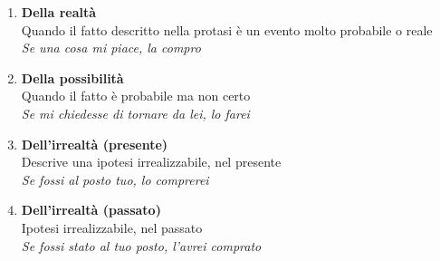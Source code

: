\documentclass[
  a4paper,
  twoside,
  11pt,
  chapterprefix=false,
  bibliography=totocnumbered,
  listof=flat]{scrbook}
\begin{document}
\begin{enumerate}
\def\labelenumi{(\arabic{enumi})}
\setcounter{enumi}{84}
\item
  \textbf{Della realtà}\\
  Quando il fatto descritto nella protasi è un evento molto probabile o reale\\
  \emph{Se una cosa mi piace, la compro}
\item
  \textbf{Della possibilità}\\
  Quando il fatto è probabile ma non certo\\
  \emph{Se mi chiedesse di tornare da lei, lo farei}
\item
  \textbf{Dell'irrealtà (presente)}\\
  Descrive una ipotesi irrealizzabile, nel presente\\
  \emph{Se fossi al posto tuo, lo comprerei}
\item
  \textbf{Dell'irrealtà (passato)}\\
  Ipotesi irrealizzabile, nel passato\\
  \emph{Se fossi stato al tuo posto, l'avrei comprato}
\end{enumerate}
\end{document}
